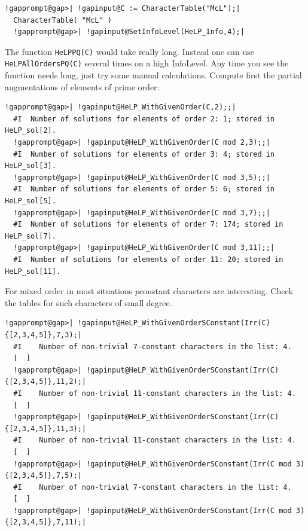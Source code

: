 \documentclass[a4paper,11pt]{report}
\begin{document}
{{ 
\begin{Verbatim}[commandchars=!@|,fontsize=\small,frame=single,label=Example]
  !gapprompt@gap>| !gapinput@C := CharacterTable("McL");|
  CharacterTable( "McL" )
  !gapprompt@gap>| !gapinput@SetInfoLevel(HeLP_Info,4);|
\end{Verbatim}
 The function \texttt{HeLP{\textunderscore}PQ(C)} would take really long. Instead one can use \texttt{HeLP{\textunderscore}AllOrdersPQ(C)} several times on a high InfoLevel. Any time you see the function needs long,
just try some manual calculations. Compute first the partial augmentations of
elements of prime order: 
\begin{Verbatim}[commandchars=!@|,fontsize=\small,frame=single,label=Example]
  !gapprompt@gap>| !gapinput@HeLP_WithGivenOrder(C,2);;|
  #I  Number of solutions for elements of order 2: 1; stored in HeLP_sol[2].    
  !gapprompt@gap>| !gapinput@HeLP_WithGivenOrder(C mod 2,3);;|
  #I  Number of solutions for elements of order 3: 4; stored in HeLP_sol[3].    
  !gapprompt@gap>| !gapinput@HeLP_WithGivenOrder(C mod 3,5);;|
  #I  Number of solutions for elements of order 5: 6; stored in HeLP_sol[5].    
  !gapprompt@gap>| !gapinput@HeLP_WithGivenOrder(C mod 3,7);;|
  #I  Number of solutions for elements of order 7: 174; stored in HeLP_sol[7].  
  !gapprompt@gap>| !gapinput@HeLP_WithGivenOrder(C mod 3,11);;|
  #I  Number of solutions for elements of order 11: 20; stored in HeLP_sol[11].
\end{Verbatim}
 For mixed order in most situations $p$\texttt{}constant characters are interesting. Check the tables for
such characters of small degree. 
\begin{Verbatim}[commandchars=!@|,fontsize=\small,frame=single,label=Example]
  !gapprompt@gap>| !gapinput@HeLP_WithGivenOrderSConstant(Irr(C){[2,3,4,5]},7,3);|
  #I    Number of non-trivial 7-constant characters in the list: 4.
  [  ]
  !gapprompt@gap>| !gapinput@HeLP_WithGivenOrderSConstant(Irr(C){[2,3,4,5]},11,2);|
  #I    Number of non-trivial 11-constant characters in the list: 4.
  [  ]                                                                          
  !gapprompt@gap>| !gapinput@HeLP_WithGivenOrderSConstant(Irr(C){[2,3,4,5]},11,3);|
  #I    Number of non-trivial 11-constant characters in the list: 4.
  [  ]  
  !gapprompt@gap>| !gapinput@HeLP_WithGivenOrderSConstant(Irr(C mod 3){[2,3,4,5]},7,5);|
  #I    Number of non-trivial 7-constant characters in the list: 4.
  [  ]  
  !gapprompt@gap>| !gapinput@HeLP_WithGivenOrderSConstant(Irr(C mod 3){[2,3,4,5]},7,11);|

\end{Verbatim}}}
\end{document}
